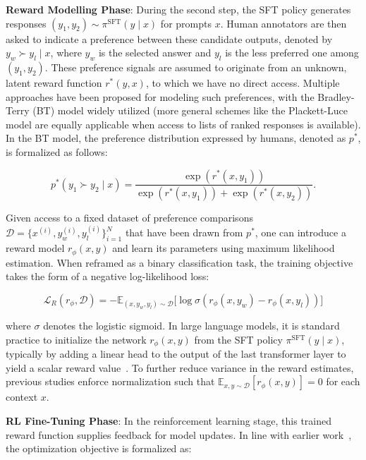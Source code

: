 \textbf{Reward Modelling Phase}: During the second step, the SFT policy generates responses $(y_1, y_2)\sim \pi^\text{SFT}(y \mid x)$ for prompts $x$. Human annotators are then asked to indicate a preference between these candidate outputs, denoted by $y_w\succ y_l \mid x$, where $y_w$ is the selected answer and $y_l$ is the less preferred one among $(y_1, y_2)$. These preference signals are assumed to originate from an unknown, latent reward function $r^*(y, x)$, to which we have no direct access. Multiple approaches have been proposed for modeling such preferences, with the Bradley-Terry (BT) \cite{bradley1952rankanalysis} model widely utilized (more general schemes like the Plackett-Luce model \citep{plackett1975analysis, luce2012individual} are equally applicable when access to lists of ranked responses is available). In the BT model, the preference distribution expressed by humans, denoted as $p^*$, is formalized as follows:

\begin{equation}\label{eq:bradley-terry}
    p^*(y_1\succ y_2 \mid x)=\frac{\exp\left(r^*(x, y_1)\right)}{\exp\left(r^*(x, y_1)\right) + \exp\left(r^*(x, y_2)\right)}.
\end{equation}

Given access to a fixed dataset of preference comparisons $\mathcal{D}=\bigl\{x^{(i)}, y_w^{(i)}, y_l^{(i)}\bigr\}_{i=1}^N$ that have been drawn from $p^*$, one can introduce a reward model $r_{\phi}(x, y)$ and learn its parameters using maximum likelihood estimation. When reframed as a binary classification task, the training objective takes the form of a negative log-likelihood loss:

\begin{equation}\label{eq:reward_model}
    \mathcal{L}_R(r_{\phi}, \mathcal{D}) = -\mathbb{E}_{(x, y_w, y_l)\sim \mathcal{D}}\bigl[\log \sigma(r_{\phi}(x, y_w)- r_{\phi}(x, y_l))\bigr]
\end{equation}

where $\sigma$ denotes the logistic sigmoid. In large language models, it is standard practice to initialize the network $r_{\phi}(x, y)$ from the SFT policy $\pi^\text{SFT}(y \mid x)$, typically by adding a linear head to the output of the last transformer layer to yield a scalar reward value~\cite{ziegler2020finetuning}. To further reduce variance in the reward estimates, previous studies enforce normalization such that $\mathbb{E}_{x,y\sim \mathcal{D}}\left[r_\phi(x, y)\right] = 0$ for each context $x$.

\textbf{RL Fine-Tuning Phase}: In the reinforcement learning stage, this trained reward function supplies feedback for model updates. In line with earlier work~\citep{jaques2017sequence, jaques2020human}, the optimization objective is formalized as:

